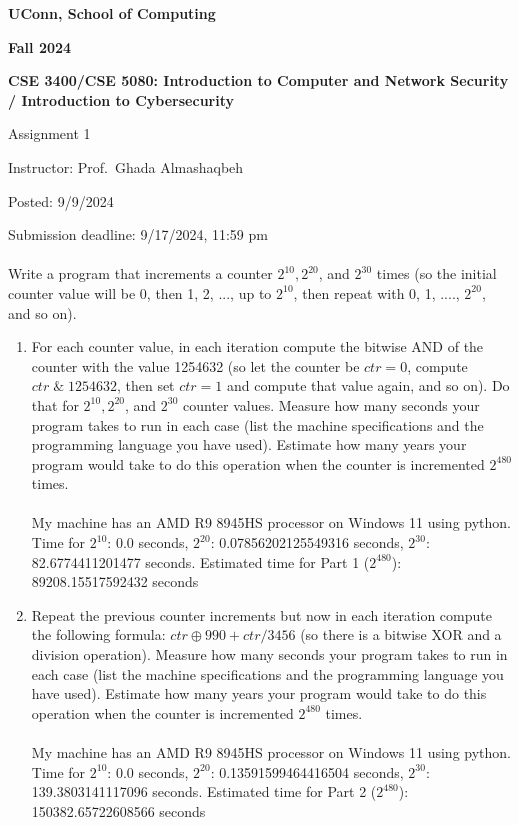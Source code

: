 \documentclass[12pt]{article}
\newcommand{\handout}[2]{
\renewcommand{\thepage}{\footnotesize CSE 3400/CSE 5850, #1, p. \arabic{page}}
\begin{center}

\noindent
{\bf UConn, School of Computing}

\noindent
{\bf Fall 2024}

\noindent
{\bf CSE 3400/CSE 5080: Introduction to Computer and Network Security \\/ Introduction to Cybersecurity}
\end{center}

\begin{center}
{\Large #1}
\end{center}
}
\begin{document}
\handout{Assignment 1}{}

\noindent
{Instructor: Prof.~Ghada Almashaqbeh}

\noindent
{Posted: 9/9/2024}

\noindent
{Submission deadline: 9/17/2024, 11:59 pm} \\\\


Write a program that increments a counter $2^{10}, 2^{20}$, and $2^{30}$ times (so the initial counter value will be 0, then 1, 2, ..., up to $2^{10}$, then repeat with 0, 1, ...., $2^{20}$, and so on). 
\begin{enumerate}
\item For each counter value, in each iteration compute the bitwise AND of the counter with the value 1254632 (so let the counter be $ctr = 0$, compute $ctr \; \& \; 1254632$, then set $ctr = 1$ and compute that value again, and so on). Do that for $2^{10}, 2^{20}$, and $2^{30}$ counter values. Measure how many seconds your program takes to run in each case (list the machine specifications and the programming language you have used). Estimate how many years your program would take to do this operation when the counter is incremented $2^{480}$ times.
\\\\My machine has an AMD R9 8945HS processor on Windows 11 using python. Time for $2^{10}$: 0.0 seconds, $2^{20}$: 0.07856202125549316 seconds, $2^{30}$: 82.6774411201477 seconds. Estimated time for Part 1 ($2^{480}$): 89208.15517592432 seconds
\item Repeat the previous counter increments but now in each iteration compute the following formula: $ctr \oplus 990 +  ctr/3456$ (so there is a bitwise XOR and a division operation). Measure how many seconds your program takes to run in each case (list the machine specifications and the programming language you have used). Estimate how many years your program would take to do this operation when the counter is incremented $2^{480}$ times. 
\\\\My machine has an AMD R9 8945HS processor on Windows 11 using python. Time for $2^{10}$: 0.0 seconds, $2^{20}$: 0.13591599464416504 seconds, $2^{30}$: 139.3803141117096 seconds. Estimated time for Part 2 ($2^{480}$): 150382.65722608566 seconds
\end{enumerate}


\end{document}
